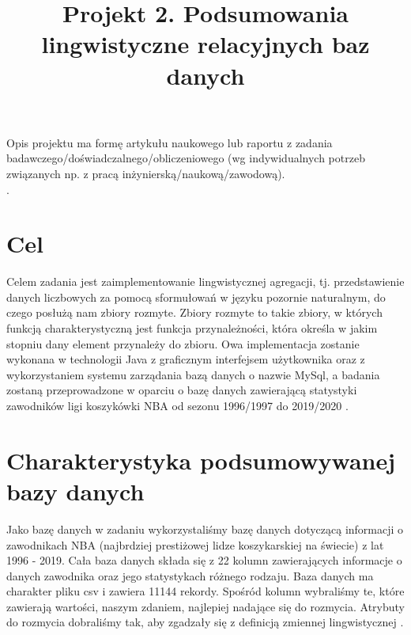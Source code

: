 \documentclass{classrep}
\author{
  \studentinfo{Hubert Gawłowski}{224298} \and
  \studentinfo{Kamil Kiszko-Zgierski}{224328} }
\title{Projekt 2.  Podsumowania lingwistyczne relacyjnych baz danych}
\begin{document}
\maketitle

Opis projektu ma formę artykułu naukowego lub raportu z zadania
badawczego/doświadczalnego/obliczeniowego (wg indywidualnych potrzeb związanych np. z
pracą inżynierską/naukową/zawodową). \\
. 

\section{Cel}
Celem zadania jest zaimplementowanie lingwistycznej agregacji, tj. przedstawienie danych liczbowych za pomocą sformułowań w języku pozornie naturalnym, do czego posłużą nam zbiory rozmyte. Zbiory rozmyte to takie zbiory, w których funkcją charakterystyczną jest funkcja przynależności, która określa w jakim stopniu dany element przynależy do zbioru. Owa implementacja zostanie wykonana w technologii Java z graficznym interfejsem użytkownika oraz z wykorzystaniem systemu zarządania bazą danych o nazwie MySql, a badania zostaną przeprowadzone w oparciu o bazę danych zawierającą statystyki zawodników ligi koszykówki NBA od sezonu 1996/1997 do 2019/2020 \cite{nba_data}.  \\


\section{Charakterystyka podsumowywanej bazy danych}

Jako bazę danych w zadaniu wykorzystaliśmy bazę danych dotyczącą informacji o zawodnikach NBA (najbrdziej prestiżowej lidze koszykarskiej na świecie) z lat 1996 - 2019. Cała baza danych składa się z 22 kolumn zawierających informacje o danych zawodnika oraz jego statystykach różnego rodzaju. Baza danych ma charakter pliku csv i zawiera 11144 rekordy. Spośród kolumn wybraliśmy te, które zawierają wartości, naszym zdaniem, najlepiej nadające się do rozmycia. Atrybuty do rozmycia dobraliśmy tak, aby zgadzały się z definicją zmiennej lingwistycznej \cite{niewiadomski19}. \\
\end{document}
